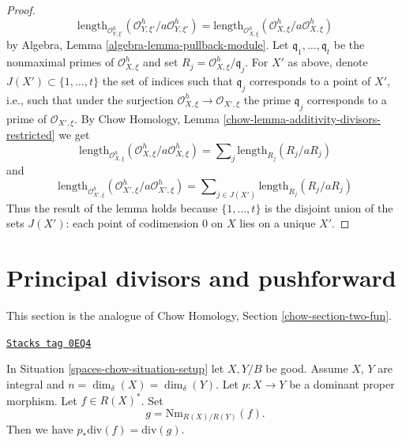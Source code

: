 \begin{proof}
$$
\text{length}_{\mathcal{O}_{Y, \xi'}^h}
(\mathcal{O}_{Y, \xi'}^h/a \mathcal{O}_{Y, \xi'}^h) =
\text{length}_{\mathcal{O}_{X, \xi}^h}
(\mathcal{O}_{X, \xi}^h/a \mathcal{O}_{X, \xi}^h)
$$
by Algebra, Lemma \ref{algebra-lemma-pullback-module}.
Let $\mathfrak q_1, \ldots, \mathfrak q_t$ be the nonmaximal
primes of $\mathcal{O}_{X, \xi}^h$ and set
$R_j = \mathcal{O}_{X, \xi}^h/\mathfrak q_j$.
For $X'$ as above, denote $J(X') \subset \{1, \ldots, t\}$
the set of indices such that $\mathfrak q_j$ corresponds
to a point of $X'$, i.e., such that under the surjection
$\mathcal{O}_{X, \xi}^h \to \mathcal{O}_{X', \xi}$
the prime $\mathfrak q_j$ corresponds to a prime
of $\mathcal{O}_{X', \xi}$.
By Chow Homology, Lemma \ref{chow-lemma-additivity-divisors-restricted}
we get
$$
\text{length}_{\mathcal{O}_{X, \xi}^h}
(\mathcal{O}_{X, \xi}^h/a \mathcal{O}_{X, \xi}^h) =
\sum\nolimits_j \text{length}_{R_j}(R_j/a R_j)
$$
and
$$
\text{length}_{\mathcal{O}_{X', \xi}^h}
(\mathcal{O}_{X', \xi}^h/a \mathcal{O}_{X', \xi}^h) =
\sum\nolimits_{j \in J(X')} \text{length}_{R_j}(R_j/a R_j)
$$
Thus the result of the lemma holds because
$\{1, \ldots, t\}$ is the disjoint union of the sets $J(X')$:
each point of codimension $0$ on $X$ lies on a unique $X'$.
\end{proof}

\section{Principal divisors and pushforward}
\label{spaces-chow-section-two-fun}
This section is the analogue of
Chow Homology, Section \ref{chow-section-two-fun}.

\begin{lemma}
\label{spaces-chow-lemma-proper-pushforward-alteration}
\href{https://stacks.math.columbia.edu/tag/0EQ4}{\texttt{Stacks tag 0EQ4}}

In Situation \ref{spaces-chow-situation-setup} let $X, Y/B$ be good.
Assume $X$, $Y$ are integral and $n = \dim_\delta(X) = \dim_\delta(Y)$.
Let $p : X \to Y$ be a dominant proper morphism.
Let $f \in R(X)^*$. Set
$$
g = \text{Nm}_{R(X)/R(Y)}(f).
$$
Then we have
$p_*\text{div}(f) = \text{div}(g)$.
\end{lemma}


